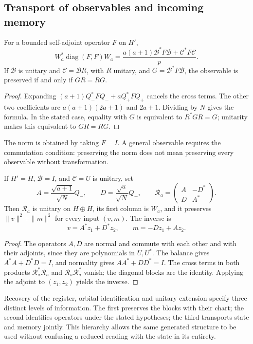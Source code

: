 \subsection{Transport of observables and incoming memory}
\label{iv:subsec:acoplamiento-lectores}

\begin{theorem}
\label{iv:thm:acoplamiento-lector}
For a bounded self-adjoint operator \(F\) on \(H'\),
\[
 W_a^*\operatorname{diag}(F,F)W_a
 =\frac{a(a+1)\mathcal B^*F\mathcal B+\mathcal C^*F\mathcal C}{p}.
\]
If \(\mathcal B\) is unitary and \(\mathcal C=\mathcal BR\), with
\(R\) unitary, and \(G=\mathcal B^*F\mathcal B\), the observable is
preserved if and only if \(GR=RG\).
\end{theorem}
\begin{proof}
Expanding \((a+1)Q_-^*FQ_-+aQ_+^*FQ_+\) cancels the cross terms.
The other two coefficients are
\(a(a+1)(2a+1)\) and \(2a+1\). Dividing by \(N\) gives the formula.
In the stated case, equality with \(G\) is equivalent to \(R^*GR=G\);
unitarity makes this equivalent to \(GR=RG\).
\end{proof}

The norm is obtained by taking \(F=I\). A general observable requires
the commutation condition: preserving the norm does not mean preserving
every observable without transformation.

\begin{theorem}
\label{iv:thm:acoplamiento-memoria}
If \(H'=H\), \(\mathcal B=I\), and \(\mathcal C=U\) is unitary, set
\[
 A=\frac{\sqrt{a+1}}{\sqrt N}Q_-,\qquad
 D=\frac{\sqrt a}{\sqrt N}Q_+,\qquad
 \mathscr R_a=\begin{pmatrix}A&-D^*\\D&A^*\end{pmatrix}.
\]
Then \(\mathscr R_a\) is unitary on \(H\oplus H\), its first
column is \(W_a\), and it preserves \(\|v\|^2+\|m\|^2\) for every
input \((v,m)\). The inverse is
\[
 v=A^*z_1+D^*z_2,\qquad m=-Dz_1+Az_2.
\]
\end{theorem}
\begin{proof}
The operators \(A,D\) are normal and commute with each other and with their
adjoints, since they are polynomials in \(U,U^*\). The balance gives
\(A^*A+D^*D=I\), and normality gives \(AA^*+DD^*=I\).
The cross terms in both products
\(\mathscr R_a^*\mathscr R_a\) and \(\mathscr R_a\mathscr R_a^*\)
vanish; the diagonal blocks are the identity. Applying the adjoint to
\((z_1,z_2)\) yields the inverse.
\end{proof}

Recovery of the register, orbital identification and unitary
extension specify three distinct levels of information. The first
preserves the blocks with their chart; the second identifies operators under
the stated hypotheses; the third transports state and memory
jointly. This hierarchy allows the same generated structure to be used without
confusing a reduced reading with the state in its entirety.
